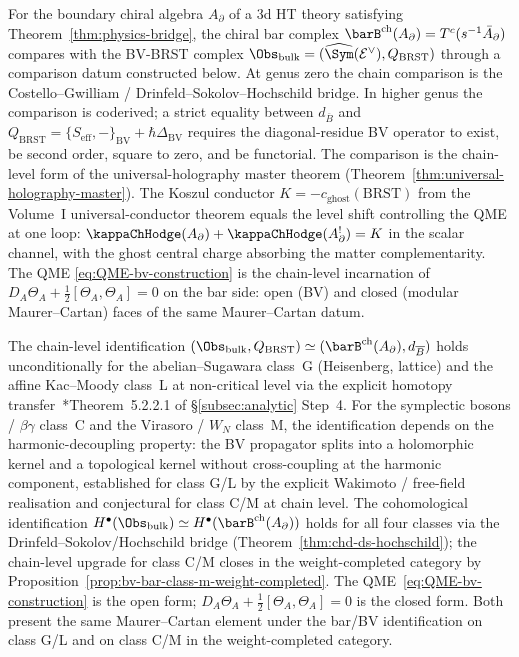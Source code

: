 \begin{remark}
\label{rem:bar-equals-BV-bridge}
For the boundary chiral algebra $A_\partial$ of a 3d HT theory satisfying
Theorem~\ref{thm:physics-bridge}, the chiral bar complex
$\barB^{\mathrm{ch}}(A_\partial) = T^c(s^{-1}\bar A_\partial)$
compares with the BV-BRST complex
$\Obs_{\mathrm{bulk}} = (\widehat{\Sym}(\mathcal E^\vee), Q_{\mathrm{BRST}})$
through a comparison datum constructed below. At
genus zero the chain comparison is the Costello--Gwilliam /
Drinfeld--Sokolov--Hochschild bridge. In higher genus the comparison is coderived; a strict equality between
$d_{\overline B}$ and
$Q_{\mathrm{BRST}}=\{S_{\mathrm{eff}},-\}_{\mathrm{BV}}
+\hbar\Delta_{\mathrm{BV}}$ requires the
diagonal-residue BV operator to exist, be second order, square to zero,
and be functorial. The comparison is the
chain-level form of the universal-holography master theorem
(Theorem~\ref{thm:universal-holography-master}).
The Koszul conductor $K = -c_{\mathrm{ghost}}(\mathrm{BRST})$ from the
Volume~I universal-conductor theorem equals the level shift controlling
the QME at one loop: $\kappaChHodge(A_\partial) + \kappaChHodge(A_\partial^!) = K$ in the
scalar channel, with the ghost central charge absorbing the matter
complementarity. The QME \eqref{eq:QME-bv-construction} is the
chain-level incarnation of $D_A\Theta_A + \tfrac12[\Theta_A, \Theta_A] = 0$
on the bar side: open (BV) and closed (modular Maurer--Cartan) faces of
the same Maurer--Cartan datum.
\end{remark}

\begin{remark}[BV $=$ bar scope: class G/L proved, class C/M conditional]
\label{rem:bv-equals-bar-scope}
The chain-level identification $(\Obs_{\mathrm{bulk}}, Q_{\mathrm{BRST}})
\simeq (\barB^{\mathrm{ch}}(A_\partial), d_{\overline B})$ holds
unconditionally for the abelian--Sugawara class~G (Heisenberg, lattice)
and the affine Kac--Moody class~L at non-critical level via the explicit
homotopy transfer~\cite{CG17}*{Theorem~5.2.2.1} of
\S\ref{subsec:analytic} Step~4. For the symplectic bosons /
$\beta\gamma$ class~C and the Virasoro / $W_N$ class~M, the
identification depends on the harmonic-decoupling
property: the BV propagator splits into a holomorphic kernel and a
topological kernel without cross-coupling at the harmonic component, established for class G/L by the explicit
Wakimoto / free-field realisation and conjectural for class C/M at
chain level. The cohomological identification
$H^\bullet(\Obs_{\mathrm{bulk}}) \simeq
H^\bullet(\barB^{\mathrm{ch}}(A_\partial))$ holds for all four classes
via the Drinfeld--Sokolov/Hochschild bridge
(Theorem~\ref{thm:chd-ds-hochschild}); the chain-level upgrade for class
C/M closes in the weight-completed category by
Proposition~\ref{prop:bv-bar-class-m-weight-completed}. The
QME~\eqref{eq:QME-bv-construction} is the open form;
$D_A\Theta_A + \tfrac12[\Theta_A, \Theta_A] = 0$ is the closed form. Both
present the same Maurer--Cartan element under the bar/BV identification on
class G/L and on class C/M in the
weight-completed category.
\end{remark}

